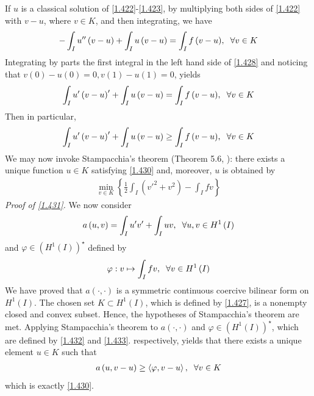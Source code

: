 \documentclass[a4paper,oneside]{book}
\numberwithin{equation}{chapter}
\begin{document}
If $u$ is a classical solution of \eqref{1.422}-\eqref{1.423}, by multiplying both sides of \eqref{1.422} with $v-u$, where $v\in K$, and then integrating,  we have
\begin{align}
\label{1.428}
 - \int_I {u''\left( {v - u} \right)}  + \int_I {u\left( {v - u} \right)}  = \int_I {f\left( {v - u} \right)} ,\hspace{0.2cm}\forall v \in K
\end{align}
Integrating by parts the first integral in the left hand side of \eqref{1.428} and noticing that $v\left(0\right)-u\left(0\right)=0,v\left(1\right)-u\left(1\right)=0$, yields
\begin{align}
\int_I {u'\left( {v - u} \right)'}  + \int_I {u\left( {v - u} \right)}  = \int_I {f\left( {v - u} \right)} ,\hspace{0.2cm}\forall v \in K
\end{align}
Then in particular,
\begin{align}
\label{1.430}
\int_I {u'\left( {v - u} \right)'}  + \int_I {u\left( {v - u} \right)}  \ge \int_I {f\left( {v - u} \right)} ,\hspace{0.2cm}\forall v \in K
\end{align}
We may now invoke Stampacchia's theorem (Theorem 5.6, \cite{1}): there exists a unique function $u\in K$ satisfying \eqref{1.430} and, moreover, $u$ is obtained by
\begin{align}
\label{1.431}
\mathop {\min }\limits_{v \in K} \left\{ {\frac{1}{2}\int_I {\left( {v{'^2} + {v^2}} \right)}  - \int_I {fv} } \right\}
\end{align}
\textit{Proof of \eqref{1.431}.} We now consider
\begin{align}
\label{1.432}
a\left( {u,v} \right) = \int_I {u'v'}  + \int_I {uv} ,\hspace{0.2cm}\forall u,v \in H^1\left(I\right)
\end{align}
and $\varphi \in \left(H^1\left(I\right)\right)^{\star}$ defined by
\begin{align}
\label{1.433}
\varphi :v \mapsto \int_I {fv} ,\hspace{0.2cm}\forall v \in H^1\left(I\right)
\end{align}
We have proved that $a\left(\cdot,\cdot\right)$ is a symmetric continuous coercive bilinear form on $H^1\left(I\right)$. The chosen set $K\subset H^1\left(I\right)$, which is defined by \eqref{1.427}, is a nonempty closed and convex subset. Hence, the hypotheses of Stampacchia's theorem are met. Applying Stampacchia's theorem to $a\left(\cdot,\cdot\right)$ and $\varphi \in \left(H^1\left(I\right)\right)^{\star}$, which are defined by \eqref{1.432} and \eqref{1.433}. respectively, yields that there exists a unique element $u\in K$ such that
\begin{align}
a\left( {u,v - u} \right) \ge \left\langle {\varphi ,v - u} \right\rangle ,\hspace{0.2cm}\forall v \in K
\end{align}
which is exactly \eqref{1.430}.
\end{document}
